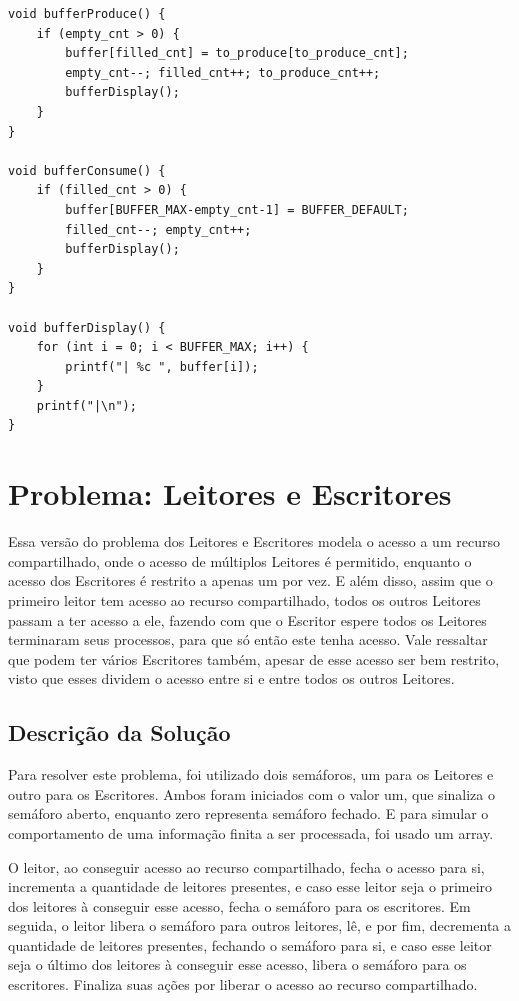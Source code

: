 \documentclass[a4paper, 11pt]{article}
\begin{document}
\begin{lstlisting}
void bufferProduce() {
    if (empty_cnt > 0) {
        buffer[filled_cnt] = to_produce[to_produce_cnt];
        empty_cnt--; filled_cnt++; to_produce_cnt++;
        bufferDisplay();
    }
}

void bufferConsume() {
    if (filled_cnt > 0) {
        buffer[BUFFER_MAX-empty_cnt-1] = BUFFER_DEFAULT;
        filled_cnt--; empty_cnt++;
        bufferDisplay();
    }
}

void bufferDisplay() {
    for (int i = 0; i < BUFFER_MAX; i++) {
        printf("| %c ", buffer[i]);
    }
    printf("|\n");
}
\end{lstlisting}

\section{Problema: Leitores e Escritores}
Essa versão do problema dos Leitores e Escritores modela o acesso a um recurso compartilhado, onde o acesso de múltiplos Leitores é permitido, enquanto o acesso dos Escritores é restrito a apenas um por vez. E além disso, assim que o primeiro leitor tem acesso ao recurso compartilhado, todos os outros Leitores passam a ter acesso a ele, fazendo com que o Escritor espere todos os Leitores terminaram seus processos, para que só então este tenha acesso. Vale ressaltar que podem ter vários Escritores também, apesar de esse acesso ser bem restrito, visto que esses dividem o acesso entre si e entre todos os outros Leitores.

\subsection{Descrição da Solução}
Para resolver este problema, foi utilizado dois semáforos, um para os Leitores e outro para os Escritores. Ambos foram iniciados com o valor um, que sinaliza o semáforo aberto, enquanto zero representa semáforo fechado. E para simular o comportamento de uma informação finita a ser processada, foi usado um array.


O leitor, ao conseguir acesso ao recurso compartilhado, fecha o acesso para si, incrementa a quantidade de leitores presentes, e caso esse leitor seja o primeiro dos leitores à conseguir esse acesso, fecha o semáforo para os escritores. Em seguida, o leitor libera o semáforo para outros leitores, lê, e por fim, decrementa a quantidade de leitores presentes, fechando o semáforo para si, e caso esse leitor seja o último dos leitores à conseguir esse acesso, libera o semáforo para os escritores. Finaliza suas ações por liberar o acesso ao recurso compartilhado.
\end{document}
